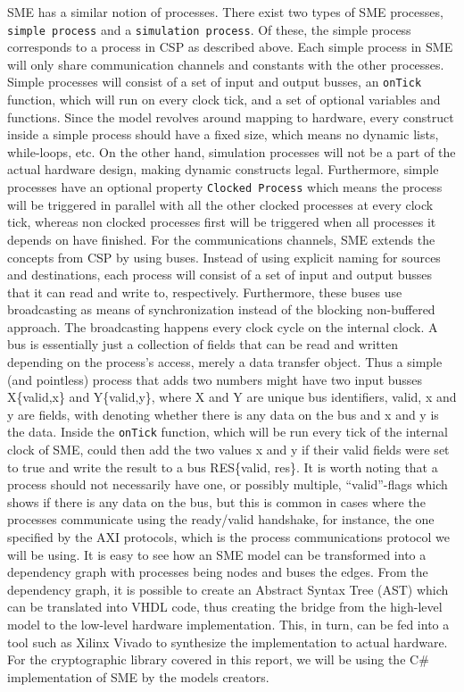 \documentclass[a4paper, openany]{book}
\begin{document}
SME has a similar notion of processes. There exist two types of SME processes, \texttt{simple process} and a \texttt{simulation process}. Of these, the simple process corresponds to a process in CSP as described above. Each simple process in SME will only share communication channels and constants with the other processes. Simple processes will consist of a set of input and output busses, an \texttt{onTick} function, which will run on every clock tick, and a set of optional variables and functions. Since the model revolves around mapping to hardware, every construct inside a simple process should have a fixed size, which means no dynamic lists, while-loops, etc. On the other hand, simulation processes will not be a part of the actual hardware design, making dynamic constructs legal. Furthermore, simple processes have an optional property \texttt{Clocked Process} which means the process will be triggered in parallel with all the other clocked processes at every clock tick, whereas non clocked processes first will be triggered when all processes it depends on have finished.
For the communications channels, SME extends the concepts from CSP by using buses. Instead of using explicit naming for sources and destinations, each process will consist of a set of input and output busses that it can read and write to, respectively. Furthermore, these buses use broadcasting as means of synchronization instead of the blocking non-buffered approach.  The broadcasting happens every clock cycle on the internal clock.
A bus is essentially just a collection of fields that can be read and written depending on the process's access, merely a data transfer object. Thus a simple (and pointless) process that adds two numbers might have two input busses X\{valid,x\} and Y\{valid,y\}, where X and Y are unique bus identifiers, valid, x and y are fields, with denoting whether there is any data on the bus and x and y is the data. Inside the \texttt{onTick} function, which will be run every tick of the internal clock of SME, could then add the two values x and y if their valid fields were set to true and write the result to a bus RES\{valid, res\}. It is worth noting that a process should not necessarily have one, or possibly multiple, ``valid''-flags which shows if there is any data on the bus, but this is common in cases where the processes communicate using the ready/valid handshake, for instance, the one specified by the AXI protocols, which is the process communications protocol we will be using. It is easy to see how an SME model can be transformed into a dependency graph with processes being nodes and buses the edges. From the dependency graph, it is possible to create an Abstract Syntax Tree (AST) which can be translated into VHDL code\cite{sme}, thus creating the bridge from the high-level model to the low-level hardware implementation. This, in turn, can be fed into a tool such as Xilinx Vivado to synthesize the implementation to actual hardware. For the cryptographic library covered in this report, we will be using the C\# implementation of SME by the models creators\cite{sme}.
\end{document}
